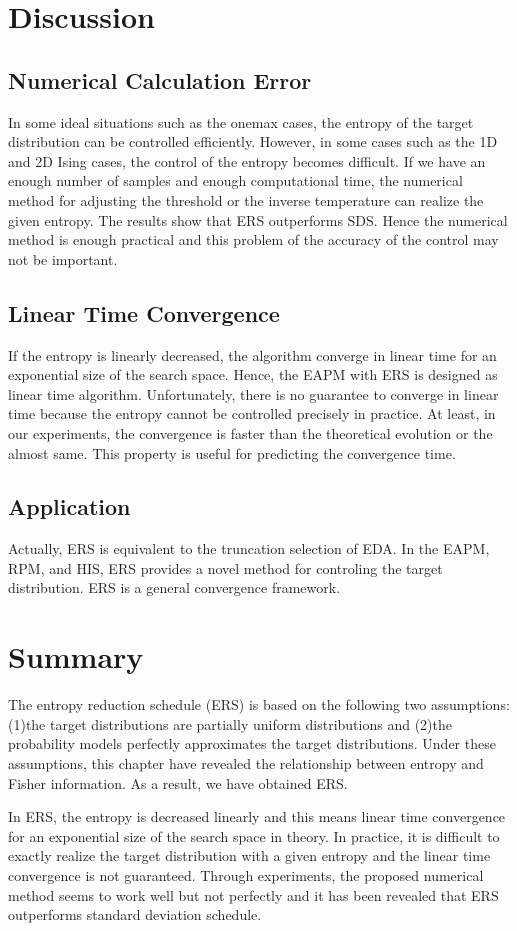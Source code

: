\section{Discussion}
\subsection{Numerical Calculation Error}
In some ideal situations such as the onemax cases,
the entropy of the target distribution can be controlled efficiently.
However, in some cases such as the 1D and 2D Ising cases,
the control of the entropy becomes difficult.
If we have an enough number of samples and enough computational time,
the numerical method for adjusting the threshold or
the inverse temperature can realize the given entropy.
The results show that ERS outperforms SDS.
Hence the numerical method is enough practical 
and this problem of the accuracy of the control may not be important.


\subsection{Linear Time Convergence}
If the entropy is linearly decreased,
the algorithm converge in linear time for an exponential size of the
search space.
Hence, the EAPM with ERS is designed as linear time algorithm.
Unfortunately, there is no guarantee to converge in linear time
because the entropy cannot be controlled precisely in practice.
At least, in our experiments,
the convergence is faster than the theoretical evolution or the almost same.
This property is useful for predicting the convergence time.


\subsection{Application}
Actually, ERS is equivalent to the truncation selection of EDA.
In the EAPM, RPM, and HIS, ERS provides a novel method for controling 
the target distribution.
ERS is a general convergence framework.


\section{Summary}
The entropy reduction schedule (ERS) is based on the following two assumptions:
(1)the target distributions are partially uniform distributions and
(2)the probability models perfectly approximates the target
distributions.
Under these assumptions,
this chapter have revealed the relationship between
entropy and Fisher information.
As a result, we have obtained ERS.

In ERS, the entropy is decreased linearly and
this means linear time convergence for an exponential size of the search
space in theory.
In practice, it is difficult
to exactly realize the target distribution with a given entropy
and the linear time convergence is not guaranteed.
Through experiments, the proposed numerical method seems to work well but not
perfectly and it has been revealed that
ERS outperforms standard deviation schedule.